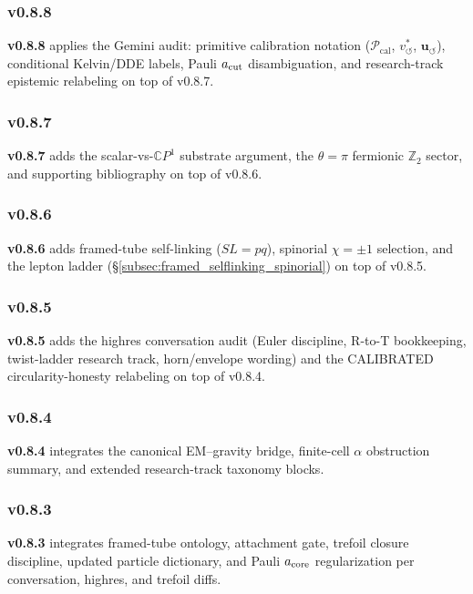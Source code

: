 \documentclass[11pt]{article}
\theoremstyle{definition}
\theoremstyle{plain}
\theoremstyle{remark}
\newcommand{\vchar}{v_{\!\boldsymbol{\circlearrowleft}}^{\ast}}
\newcommand{\uswirl}{\mathbf{u}_{\!\boldsymbol{\circlearrowleft}}}
\begin{document}
        \subsubsection{v0.8.8}
            \textbf{v0.8.8} applies the Gemini audit: primitive calibration notation ($\mathcal{P}_{\mathrm{cal}}$, $\vchar$, $\uswirl$), conditional Kelvin/DDE labels, Pauli $a_{\rm cut}$ disambiguation, and research-track epistemic relabeling on top of v0.8.7.

        \subsubsection{v0.8.7}
            \textbf{v0.8.7} adds the scalar-vs-$\mathbb{C}P^1$ substrate argument, the $\theta=\pi$ fermionic $\mathbb{Z}_2$ sector, and supporting bibliography on top of v0.8.6.

        \subsubsection{v0.8.6}
            \textbf{v0.8.6} adds framed-tube self-linking ($SL=pq$), spinorial $\chi=\pm1$ selection, and the lepton ladder (\S\ref{subsec:framed_selflinking_spinorial}) on top of v0.8.5.

        \subsubsection{v0.8.5}
            \textbf{v0.8.5} adds the highres conversation audit (Euler discipline, R-to-T bookkeeping, twist-ladder research track, horn/envelope wording) and the CALIBRATED circularity-honesty relabeling on top of v0.8.4.

        \subsubsection{v0.8.4}
            \textbf{v0.8.4} integrates the canonical EM--gravity bridge, finite-cell $\alpha$ obstruction summary, and extended research-track taxonomy blocks.

        \subsubsection{v0.8.3}
            \textbf{v0.8.3} integrates framed-tube ontology, attachment gate, trefoil closure discipline, updated particle dictionary, and Pauli $a_{\rm core}$ regularization per conversation, highres, and trefoil diffs.
\end{document}
